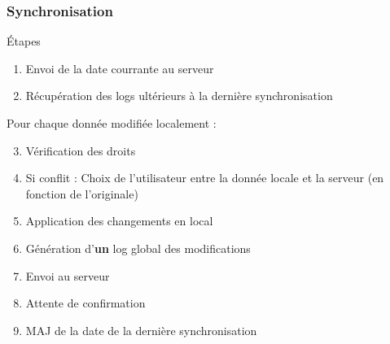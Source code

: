 \begin{frame}
\frametitle{Synchronisation}

\begin{block}{Étapes}
\begin{enumerate}
    \item Envoi de la date courrante au serveur %
    \item Récupération des logs ultérieurs à la dernière synchronisation
\end{enumerate}
\vspace{-1em}
\hspace*{.05\linewidth}\begin{minipage}{.9\linewidth}
    \begin{block}{Pour chaque donnée modifiée localement :}
    \begin{enumerate}
    \setcounter{enumi}{2}
        \item Vérification des droits
        \item Si conflit : Choix de l'utilisateur entre la donnée locale et la serveur (en fonction de l'originale)
    \end{enumerate}
    \end{block}
\end{minipage}
\begin{enumerate}
\setcounter{enumi}{4}
    \item Application des changements en local
    \item Génération d'\textbf{un} log global des modifications
    \item Envoi au serveur
    \item Attente de confirmation
    \item MAJ de la date de la dernière synchronisation
\end{enumerate}
\end{block} 

\end{frame} %


